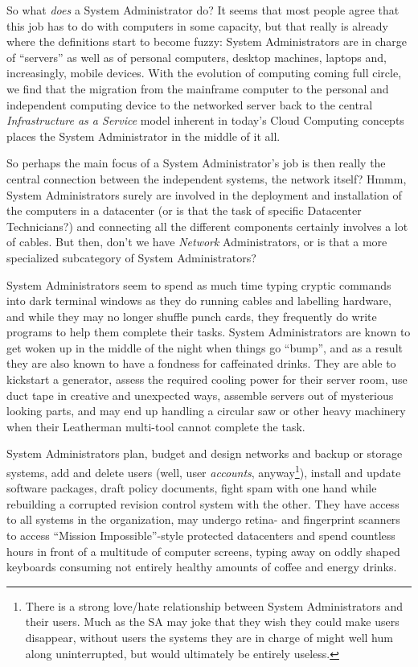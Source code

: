 So what {\em does} a System Administrator do?  It
seems that most people agree that this job has to do
with computers in some capacity, but that really is
already where the definitions start to become fuzzy:
System Administrators are in charge of ``servers'' as
well as of personal computers, desktop machines,
laptops and, increasingly, mobile devices.  With the
evolution of computing coming full circle, we find
that the migration from the mainframe computer to the
personal and independent computing device to the
networked server back to the central {\em
Infrastructure as a Service} model inherent in today's Cloud
Computing concepts places the
System Administrator in the middle of it all.

So perhaps the main focus of a System Administrator's
job is then really the central connection between the
independent systems, the network itself?  Hmmm, System
Administrators surely are involved in the deployment
and installation of the computers in a datacenter (or
is that the task of specific Datacenter Technicians?)
and connecting all the different components certainly
involves a lot of cables.  But then, don't we have
{\em Network} Administrators, or is that a more
specialized subcategory of System Administrators?

System Administrators seem to spend as much time
typing cryptic commands into dark terminal windows as
they do running cables and labelling hardware, and
while they may no longer shuffle punch cards, they
frequently do write programs to help them complete
their tasks.  System Administrators are known to get
woken up in the middle of the night when things go
``bump'', and as a result they are also known to have
a fondness for caffeinated drinks.  They are able to
kickstart a generator, assess the required cooling
power for their server room, use duct tape in creative
and unexpected ways, assemble servers out of
mysterious looking parts, and may end up handling a
circular saw or other heavy machinery when their
Leatherman multi-tool cannot complete the task.

System Administrators plan, budget and design networks
and backup or storage systems, add and delete users
(well, user {\em accounts}, anyway\footnote{There is a
strong love/hate relationship between System
Administrators and their users.  Much as the SA may
joke that they wish they could make users disappear,
without users the systems they are in charge of
might well hum along uninterrupted, but would
ultimately be entirely useless.}), install and update
software packages, draft policy documents, fight spam
with one hand while rebuilding a corrupted revision
control system with the other.
They have access to all systems in the organization,
may undergo retina- and fingerprint scanners to access
``Mission Impossible''-style protected datacenters and
spend countless hours in front of a multitude of
computer screens, typing away on oddly shaped
keyboards consuming not entirely healthy amounts of
coffee and energy drinks.


